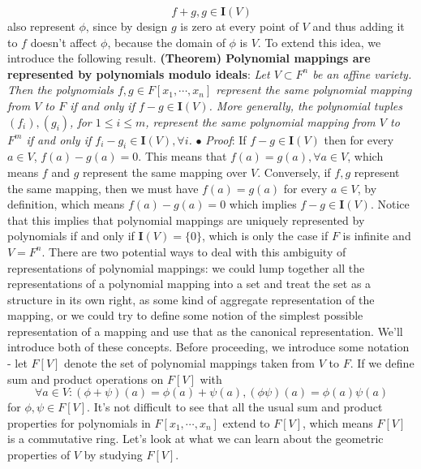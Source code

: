 \documentclass{article}
\newcommand*{\tb}{\textbf}
\newcommand*{\ti}{\textit}
\newcommand*{\n}{\newline}
\newcommand*{\nn}{\newline \newline}
\newcommand*{\Pf}{\indent \ensuremath{\bullet} \textit{Proof}: }
\newcommand*{\Fx}{\ensuremath{F[x_1, \cdots, x_n]}}
\newcommand*{\IV}{\ensuremath{\mathbf{I}(V)}}
\begin{document}
$$ f + g, g \in \IV $$
also represent $ \phi $, since by design $ g $ is zero at every point of $ V $ and thus adding it to $ f $ doesn't affect $ \phi $, because the domain of $ \phi $ is $ V $. To extend this idea, we introduce the following result.
\nn
\tb{(Theorem) Polynomial mappings are represented by polynomials modulo ideals}: \ti{Let $ V \subset F^n $ be an affine variety. Then the polynomials $ f, g \in \Fx $ represent the same polynomial mapping from $ V $ to $ F $ if and only if $ f - g \in \IV $. More generally, the polynomial tuples $ (f_i), (g_i) $, for $ 1 \leq i \leq m $, represent the same polynomial mapping from $ V $ to $ F^m $ if and only if $ f_i - g_i \in \IV, \forall i $.}
\n
\Pf If $ f - g \in \IV $ then for every $ a \in V $, $ f(a) - g(a) = 0 $. This means that $ f(a) = g(a), \forall a \in V $, which means $ f $ and $ g $ represent the same mapping over $ V $. Conversely, if $ f, g $ represent the same mapping, then we must have $ f(a) = g(a) $ for every $ a \in V $, by definition, which means $ f(a) - g(a) = 0 $ which implies $ f - g \in \IV $. \qedsymbol
\nn
Notice that this implies that polynomial mappings are uniquely represented by polynomials if and only if $ \IV = \{ 0 \} $, which is only the case if $ F $ is infinite and $ V = F^n $. There are two potential ways to deal with this ambiguity of representations of polynomial mappings: we could lump together all the representations of a polynomial mapping into a set and treat the set as a structure in its own right, as some kind of aggregate representation of the mapping, or we could try to define some notion of the simplest possible representation of a mapping and use that as the canonical representation. We'll introduce both of these concepts. Before proceeding, we introduce some notation - let $ F[V] $ denote the set of polynomial mappings taken from $ V $ to $ F $. If we define sum and product operations on $ F[V] $ with
$$ \forall a \in V: (\phi + \psi)(a) = \phi(a) + \psi(a), (\phi \psi)(a) = \phi(a) \psi(a) $$
for $ \phi, \psi \in F[V] $. It's not difficult to see that all the usual sum and product properties for polynomials in $ \Fx $ extend to $ F[V] $, which means $ F[V] $ is a commutative ring. Let's look at what we can learn about the geometric properties of $ V $ by studying $ F[V] $.
\n
\end{document}

